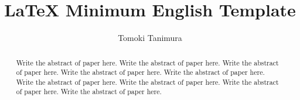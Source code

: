 \documentclass[autodetect-engine, a4paper, twocolumn]{article}
\title{LaTeX Minimum English Template}
\author{Tomoki Tanimura}
\date{\empty}
\begin{document}
\maketitle

\begin{abstract}
Write the abstract of paper here.
Write the abstract of paper here.
Write the abstract of paper here.
Write the abstract of paper here.
Write the abstract of paper here.
Write the abstract of paper here.
Write the abstract of paper here.
Write the abstract of paper here.
Write the abstract of paper here.
\end{abstract}






\end{document}
